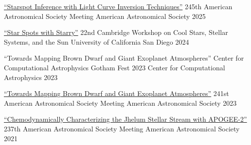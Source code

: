 \begin{presentation}
{\href{https://ui.adsabs.harvard.edu/abs/2025AAS...24540315R/abstract}{``Starspot Inference with Light Curve Inversion Techniques''}}
{245th American Astronomical Society Meeting}
{American Astronomical Society}
{2025}
\end{presentation}

\begin{presentation}
{\href{https://zenodo.org/records/13224983}{``Star Spots with Starry''}}
{22nd Cambridge Workshop on Cool Stars, Stellar Systems, and the Sun}
{University of California San Diego}
{2024}
\end{presentation}

\begin{presentation}
{``Towards Mapping Brown Dwarf and Giant Exoplanet Atmospheres''}
{Center for Computational Astrophysics Gotham Fest 2023}
{Center for Computational Astrophysics}
{2023}
\end{presentation}

\begin{presentation}
{\href{https://ui.adsabs.harvard.edu/abs/2023AAS...24120402R/abstract}{``Towards Mapping Brown Dwarf and Giant Exoplanet Atmospheres''}}
{241st American Astronomical Society Meeting}
{American Astronomical Society}
{2023}
\end{presentation}

\begin{presentation}
{\href{https://ui.adsabs.harvard.edu/abs/2021AAS...23715410S/abstract}{``Chemodynamically Characterizing the Jhelum Stellar Stream with APOGEE-2''}}
{237th American Astronomical Society Meeting}
{American Astronomical Society}
{2021}
\end{presentation}